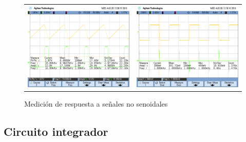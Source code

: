 \begin{figure}[H]
\begin{tabular}{c c}
		\includegraphics[scale=0.2]{Derivador/Mediciones/Osciloscopio/PCB_Compensado/osc_8.png} &
		\includegraphics[scale=0.2]{Derivador/Mediciones/Osciloscopio/PCB_Compensado/scope_23.png} 
	\end{tabular}
	\caption{Medici\'on de respuesta a se\~nales no senoidales}
	\label{fig:respuesta_derivador_compensado}
\end{figure}

	\subsection{Circuito integrador}

